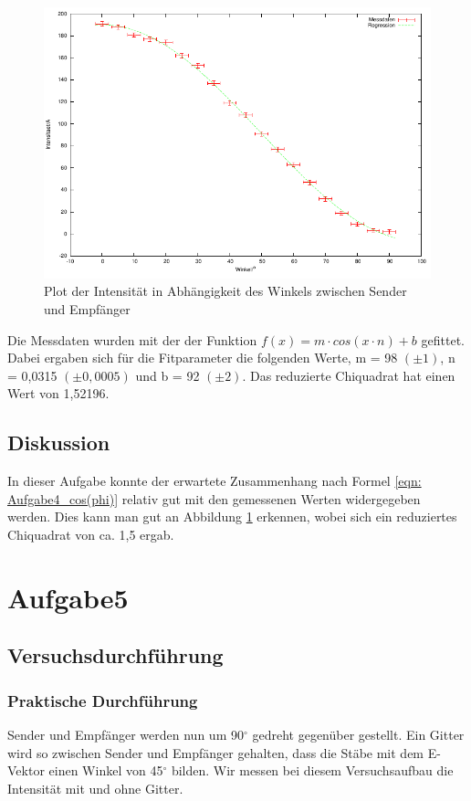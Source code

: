 \documentclass[12pt]{scrartcl}
\begin{document}
\begin{figure}[H]
\centering
    \includegraphics[scale = 1]{a_4.pdf}
  	\caption[Plot der Intensität in Abhängigkeit des Winkels zwischen Sender und Empfänger]{Plot der Intensität in Abhängigkeit des Winkels zwischen Sender und Empfänger}
  \label{fig:a_4}
\end{figure}

Die Messdaten wurden mit der der Funktion $ f(x) = m \cdot cos(x \cdot n) + b$ gefittet. Dabei ergaben sich für die Fitparameter die folgenden Werte, m = 98 $(\pm 1)$, n = 0,0315 $(\pm 0,0005)$ und b = 92 $(\pm 2)$. Das reduzierte Chiquadrat hat einen Wert von 1,52196.
\subsection{Diskussion}
In dieser Aufgabe konnte der erwartete Zusammenhang nach Formel \ref{eqn: Aufgabe4_cos(phi)} relativ gut mit den gemessenen Werten widergegeben werden.
Dies kann man gut an Abbildung \ref{fig:a_4} erkennen, wobei sich ein reduziertes Chiquadrat von ca. 1,5 ergab.
\section{Aufgabe5}
\subsection{Versuchsdurchführung}
\subsubsection{Praktische Durchführung}
Sender und Empfänger werden nun um 90$^{\circ}$ gedreht gegenüber gestellt. Ein Gitter wird so zwischen Sender und Empfänger gehalten, dass die Stäbe mit dem E-Vektor einen Winkel von 45$^{\circ}$ bilden. Wir messen bei diesem Versuchsaufbau die Intensität mit und ohne Gitter.
\end{document}
